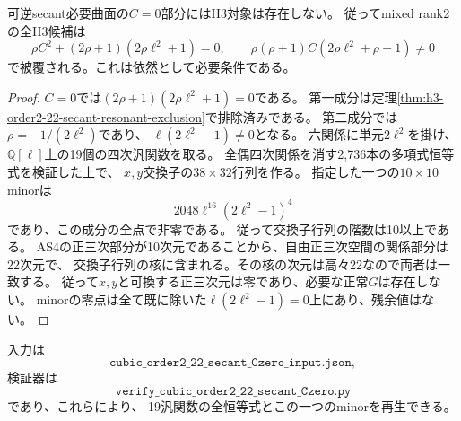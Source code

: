 \begin{theorem}[$C=0$部分の全値排除]
\label{thm:h3-order2-22-secant-Czero}
可逆secant必要曲面の$C=0$部分にはH3対象は存在しない。
従ってmixed rank2の全H3候補は
\[
 \rho C^2+(2\rho+1)(2\rho\ell^2+1)=0,\qquad
 \rho(\rho+1)C(2\rho\ell^2+\rho+1)\ne0
\]
で被覆される。これは依然として必要条件である。
\end{theorem}
\begin{proof}
$C=0$では$(2\rho+1)(2\rho\ell^2+1)=0$である。
第一成分は定理\ref{thm:h3-order2-22-secant-resonant-exclusion}で排除済みである。
第二成分では$\rho=-1/(2\ell^2)$であり、
$\ell(2\ell^2-1)\ne0$となる。
六関係に単元$2\ell^2$を掛け、$\mathbb Q[\ell]$上の19個の四次汎関数を取る。
全偶四次関係を消す2,736本の多項式恒等式を検証した上で、
$x,y$交換子の$38\times32$行列を作る。
指定した一つの$10\times10$ minorは
\[
 2048\ell^{16}(2\ell^2-1)^4
\]
であり、この成分の全点で非零である。
従って交換子行列の階数は10以上である。
AS4の正三次部分が10次元であることから、自由正三次空間の関係部分は22次元で、
交換子行列の核に含まれる。その核の次元は高々22なので両者は一致する。
従って$x,y$と可換する正三次元は零であり、必要な正常$G$は存在しない。
minorの零点は全て既に除いた$\ell(2\ell^2-1)=0$上にあり、残余値はない。
\end{proof}

入力は
\[
 \texttt{cubic\_order2\_22\_secant\_Czero\_input.json},
\]
検証器は
\[
 \texttt{verify\_cubic\_order2\_22\_secant\_Czero.py}
\]
であり、これらにより、
19汎関数の全恒等式とこの一つのminorを再生できる。


